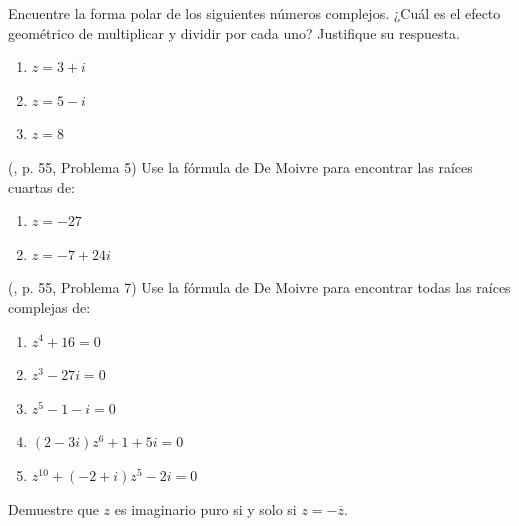 \begin{prob} 
Encuentre la forma polar de los siguientes números complejos. ¿Cuál es el efecto geométrico de multiplicar y dividir por cada uno? Justifique su respuesta.

\begin{multicols}{3}
\begin{enumerate}[$a)$]
\item $z=3+i$
\item $z=5-i$
\item $z=8$
\end{enumerate}
\end{multicols}
\end{prob}

\begin{prob}  
(\cite{andreescu2014complex}, p. 55, Problema 5) Use la fórmula de De Moivre para encontrar las raíces cuartas de:
\begin{multicols}{2}
\begin{enumerate}[$a)$]
\item $z=-27$
\item $z=-7+24i$
\end{enumerate}
\end{multicols}
\end{prob}

\begin{prob}  
(\cite{andreescu2014complex}, p. 55, Problema 7) Use la fórmula de De Moivre para encontrar todas las raíces complejas de:
\begin{multicols}{2}
\begin{enumerate}[$a)$]
\item $z^4+16=0$
\item $z^3-27i=0$
\item $z^5-1-i=0$
\item $(2-3i)z^6+1+5i=0$
\item $z^{10}+(-2+i)z^5-2i=0$
\end{enumerate}
\end{multicols}
\end{prob}

\begin{prob} 
Demuestre que $z$ es imaginario puro si y solo si $z=-\overline{z}$.
\end{prob}